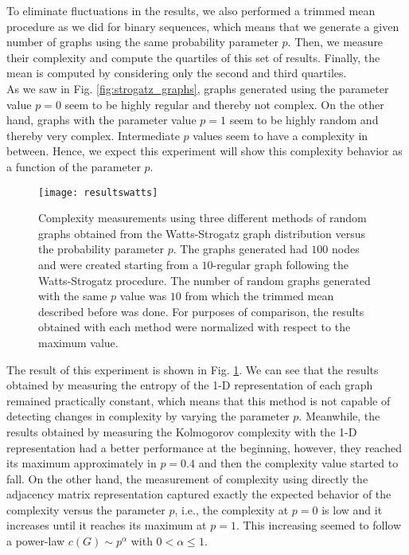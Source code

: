 To eliminate fluctuations in the results, we also performed a trimmed mean procedure as we did for binary sequences, which means that we generate a given number of graphs using the same probability parameter $p$. Then, we measure their complexity and compute the quartiles of this set of results. Finally, the mean is computed by considering only the second and third quartiles.\\

As we saw in Fig. \ref{fig:strogatz_graphs}, graphs generated using the parameter value $p=0$ seem to be highly regular and thereby not complex. On the other hand, graphs with the parameter value $p=1$ seem to be highly random and thereby very complex. Intermediate $p$ values seem to have a complexity in between. Hence, we expect this experiment will show this complexity behavior as a function of the parameter $p$.\\

\begin{figure}
\centering
\texttt{[image: resultswatts]}
\caption[Complexity measurements using three different methods of random graphs obtained from the Watts-Strogatz graph distribution.]{Complexity measurements using three different methods of random graphs obtained from the Watts-Strogatz graph distribution versus the probability parameter $p$. The graphs generated had $100$ nodes and were created starting from a $10$-regular graph following the Watts-Strogatz procedure. The number of random graphs generated with the same $p$ value was $10$ from which the trimmed mean described before was done. For purposes of comparison, the results obtained with each method were normalized with respect to the maximum value.}
\label{fig:resultswatts}
\end{figure}

The result of this experiment is shown in Fig. \ref{fig:resultswatts}. We can see that the results obtained by measuring the entropy of the 1-D representation of each graph remained practically constant, which means that this method is not capable of detecting changes in complexity by varying the parameter $p$. Meanwhile, the results obtained by measuring the Kolmogorov complexity with the 1-D representation had a better performance at the beginning, however, they reached its maximum approximately in $p=0.4$ and then the complexity value started to fall. On the other hand, the measurement of complexity using directly the adjacency matrix representation captured exactly the expected behavior of the complexity versus the parameter $p$, i.e., the complexity at $p=0$ is low and it increases until it reaches its maximum at $p=1$. This increasing seemed to follow a power-law $c(G) \sim p^{\alpha}$ with $0 < \alpha \leq 1$.\\

